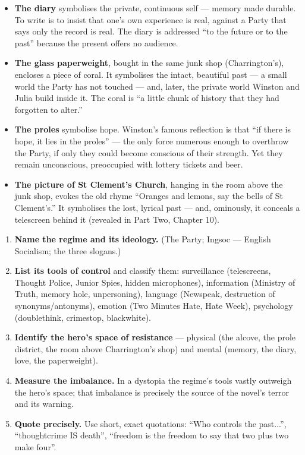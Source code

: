\documentclass[11pt]{article}
\begin{document}
\begin{itemize}
\item \textbf{The diary} symbolises the private, continuous self --- memory made durable. To write is to insist that one's own experience is real, against a Party that says only the record is real. The diary is addressed ``to the future or to the past'' because the present offers no audience.
\item \textbf{The glass paperweight}, bought in the same junk shop (Charrington's), encloses a piece of coral. It symbolises the intact, beautiful past --- a small world the Party has not touched --- and, later, the private world Winston and Julia build inside it. The coral is ``a little chunk of history that they had forgotten to alter.''
\item \textbf{The proles} symbolise hope. Winston's famous reflection is that ``if there is hope, it lies in the proles'' --- the only force numerous enough to overthrow the Party, if only they could become conscious of their strength. Yet they remain unconscious, preoccupied with lottery tickets and beer.
\item \textbf{The picture of St Clement's Church}, hanging in the room above the junk shop, evokes the old rhyme ``Oranges and lemons, say the bells of St Clement's.'' It symbolises the lost, lyrical past --- and, ominously, it conceals a telescreen behind it (revealed in Part Two, Chapter 10).
\end{itemize}

\begin{methode}
\begin{enumerate}
\item \textbf{Name the regime and its ideology.} (The Party; Ingsoc --- English Socialism; the three slogans.)
\item \textbf{List its tools of control} and classify them: surveillance (telescreens, Thought Police, Junior Spies, hidden microphones), information (Ministry of Truth, memory hole, unpersoning), language (Newspeak, destruction of synonyms/antonyms), emotion (Two Minutes Hate, Hate Week), psychology (doublethink, crimestop, blackwhite).
\item \textbf{Identify the hero's space of resistance} --- physical (the alcove, the prole district, the room above Charrington's shop) and mental (memory, the diary, love, the paperweight).
\item \textbf{Measure the imbalance.} In a dystopia the regime's tools vastly outweigh the hero's space; that imbalance is precisely the source of the novel's terror and its warning.
\item \textbf{Quote precisely.} Use short, exact quotations: ``Who controls the past...'', ``thoughtcrime IS death'', ``freedom is the freedom to say that two plus two make four''.
\end{enumerate}
\end{methode}
\end{document}
